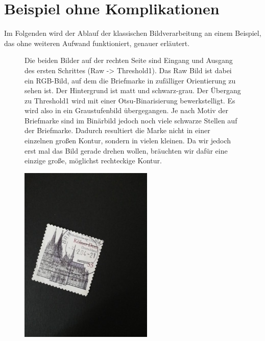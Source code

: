 \documentclass[12pt,toc=bib,toc=listof]{scrreprt}
\begin{document}
\section{Beispiel ohne Komplikationen}
\label{sec_bv:paradebsp}

Im Folgenden wird der Ablauf der klassischen Bildverarbeitung an einem Beispiel, das ohne weiteren Aufwand funktioniert, genauer erläutert.
\begin{figure}

\begin{minipage}[t]{.75\linewidth}
Die beiden Bilder auf der rechten Seite sind Eingang und Ausgang des ersten Schrittes (Raw -> Threshold1). Das Raw Bild ist dabei ein RGB-Bild, auf dem die Briefmarke in zufälliger Orientierung zu sehen ist. Der Hintergrund ist matt und schwarz-grau. Der Übergang zu Threshold1 wird mit einer Otsu-Binarisierung bewerkstelligt. Es wird also in ein Graustufenbild übergegangen. Je nach Motiv der Briefmarke sind im Binärbild jedoch noch viele schwarze Stellen auf der Briefmarke. Dadurch resultiert die Marke nicht in einer einzelnen großen Kontur, sondern in vielen kleinen. Da wir jedoch erst mal das Bild gerade drehen wollen, bräuchten wir dafür eine einzige große, möglichst rechteckige Kontur.
\end{minipage}
\hfill
\begin{minipage}[t]{.2\linewidth}
  \strut\vspace*{-\baselineskip}\newline\includegraphics[width=\linewidth]{./bilder/start_dom}

\end{minipage}
\end{figure}
\end{document}

